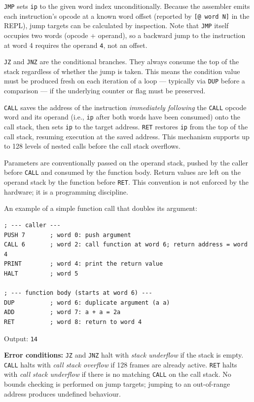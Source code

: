 \texttt{JMP} sets \texttt{ip} to the given word index unconditionally. Because the assembler emits each instruction's opcode at a known word offset (reported by \texttt{[@ word N]} in the REPL), jump targets can be calculated by inspection. Note that \texttt{JMP} itself occupies two words (opcode + operand), so a backward jump to the instruction at word 4 requires the operand \texttt{4}, not an offset.

\texttt{JZ} and \texttt{JNZ} are the conditional branches. They always consume the top of the stack regardless of whether the jump is taken. This means the condition value must be produced fresh on each iteration of a loop — typically via \texttt{DUP} before a comparison — if the underlying counter or flag must be preserved.

\texttt{CALL} saves the address of the instruction \textit{immediately following} the \texttt{CALL} opcode word and its operand (i.e., \texttt{ip} after both words have been consumed) onto the call stack, then sets \texttt{ip} to the target address. \texttt{RET} restores \texttt{ip} from the top of the call stack, resuming execution at the saved address. This mechanism supports up to 128 levels of nested calls before the call stack overflows.

Parameters are conventionally passed on the operand stack, pushed by the caller before \texttt{CALL} and consumed by the function body. Return values are left on the operand stack by the function before \texttt{RET}. This convention is not enforced by the hardware; it is a programming discipline.

An example of a simple function call that doubles its argument:

\begin{lstlisting}
; --- caller ---
PUSH 7       ; word 0: push argument
CALL 6       ; word 2: call function at word 6; return address = word 4
PRINT        ; word 4: print the return value
HALT         ; word 5

; --- function body (starts at word 6) ---
DUP          ; word 6: duplicate argument (a a)
ADD          ; word 7: a + a = 2a
RET          ; word 8: return to word 4
\end{lstlisting}

Output: \texttt{14}

\textbf{Error conditions:} \texttt{JZ} and \texttt{JNZ} halt with \textit{stack underflow} if the stack is empty. \texttt{CALL} halts with \textit{call stack overflow} if 128 frames are already active. \texttt{RET} halts with \textit{call stack underflow} if there is no matching \texttt{CALL} on the call stack. No bounds checking is performed on jump targets; jumping to an out-of-range address produces undefined behaviour.

